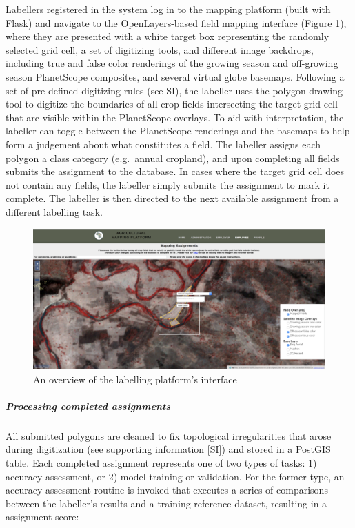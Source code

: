 \documentclass[11pt,a4paper]{article}
\begin{document}
Labellers registered in the system log in to the mapping platform (built
with Flask) and navigate to the OpenLayers-based field mapping interface
(Figure \ref{fig:labeller}), where they are presented with a white
target box representing the randomly selected grid cell, a set of
digitizing tools, and different image backdrops, including true and
false color renderings of the growing season and off-growing season
PlanetScope composites, and several virtual globe basemaps. Following a
set of pre-defined digitizing rules (see SI), the labeller uses the
polygon drawing tool to digitize the boundaries of all crop fields
intersecting the target grid cell that are visible within the
PlanetScope overlays. To aid with interpretation, the labeller can
toggle between the PlanetScope renderings and the basemaps to help form
a judgement about what constitutes a field. The labeller assigns each
polygon a class category (e.g.~annual cropland), and upon completing all
fields submits the assignment to the database. In cases where the target
grid cell does not contain any fields, the labeller simply submits the
assignment to mark it complete. The labeller is then directed to the
next available assignment from a different labelling task.

\begin{figure}

{\centering \includegraphics[width=0.95\linewidth]{figures/figure3} 

}

\caption{An overview of the labelling platform's interface}\label{fig:labeller}
\end{figure}

\hypertarget{processing-completed-assignments}{%
\subparagraph{Processing completed
assignments}\label{processing-completed-assignments}}

All submitted polygons are cleaned to fix topological irregularities
that arose during digitization (see supporting information {[}SI{]}) and
stored in a PostGIS table. Each completed assignment represents one of
two types of tasks: 1) accuracy assessment, or 2) model training or
validation. For the former type, an accuracy assessment routine is
invoked that executes a series of comparisons between the labeller's
results and a training reference dataset, resulting in a assignment
score:
\end{document}
